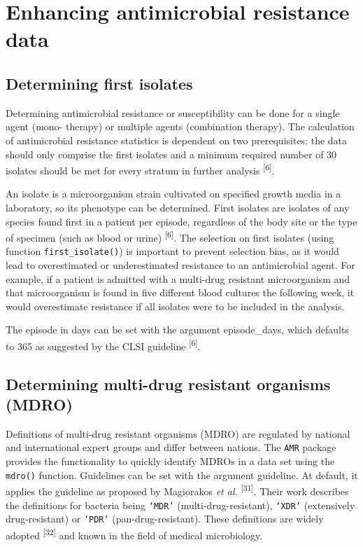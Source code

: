 \documentclass[
]{book}
\begin{document}
\hypertarget{enhancing-antimicrobial-resistance-data}{%
\section{Enhancing antimicrobial resistance data}\label{enhancing-antimicrobial-resistance-data}}

\hypertarget{determining-first-isolates}{%
\subsection{Determining first isolates}\label{determining-first-isolates}}

Determining antimicrobial resistance or susceptibility can be done for a single agent (mono- therapy) or multiple agents (combination therapy). The calculation of antimicrobial resistance statistics is dependent on two prerequisites: the data should only comprise the first isolates and a minimum required number of 30 isolates should be met for every stratum in further analysis \textsuperscript{{[}6{]}}.

An isolate is a microorganism strain cultivated on specified growth media in a laboratory, so its phenotype can be determined. First isolates are isolates of any species found first in a patient per episode, regardless of the body site or the type of specimen (such as blood or urine) \textsuperscript{{[}6{]}}. The selection on first isolates (using function \texttt{first\_isolate()}) is important to prevent selection bias, as it would lead to overestimated or underestimated resistance to an antimicrobial agent. For example, if a patient is admitted with a multi-drug resistant microorganism and that microorganism is found in five different blood cultures the following week, it would overestimate resistance if all isolates were to be included in the analysis.

The episode in days can be set with the argument episode\_days, which defaults to 365 as suggested by the CLSI guideline \textsuperscript{{[}6{]}}.

\hypertarget{determining-multi-drug-resistant-organisms-mdro}{%
\subsection{Determining multi-drug resistant organisms (MDRO)}\label{determining-multi-drug-resistant-organisms-mdro}}

Definitions of multi-drug resistant organisms (MDRO) are regulated by national and international expert groups and differ between nations. The \texttt{AMR} package provides the functionality to quickly identify MDROs in a data set using the \texttt{mdro()} function. Guidelines can be set with the argument guideline. At default, it applies the guideline as proposed by Magiorakos \emph{et al.} \textsuperscript{{[}31{]}}. Their work describes the definitions for bacteria being \texttt{‘MDR’} (multi-drug-resistant), \texttt{‘XDR’} (extensively drug-resistant) or \texttt{‘PDR’} (pan-drug-resistant). These definitions are widely adopted \textsuperscript{{[}32{]}} and known in the field of medical microbiology.
\end{document}
